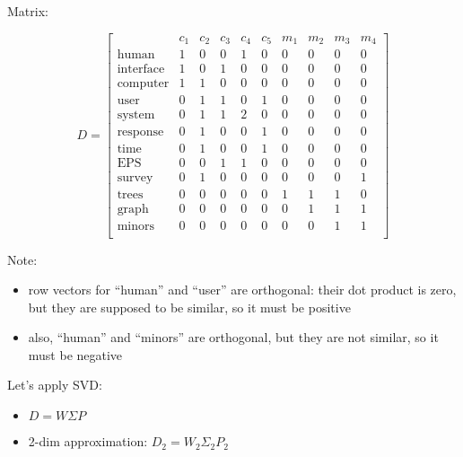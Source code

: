Matrix:

$$D =
\left[\begin{array}{c|ccccccccc}
 & c_1 & c_2 & c_3 & c_4 & c_5 & m_1 & m_2 & m_3 & m_4 \\ 
\hline
\text{human} & 1 & 0 & 0 & 1 & 0 & 0 & 0 & 0 & 0 \\
\text{interface} & 1 & 0 & 1 & 0 & 0 & 0 & 0 & 0 & 0 \\ 
\text{computer} & 1 & 1 & 0 & 0 & 0 & 0 & 0 & 0 & 0 \\
\text{user} & 0 & 1 & 1 & 0 & 1 & 0 & 0 & 0 & 0 \\ 
\text{system} & 0 & 1 & 1 & 2 & 0 & 0 & 0 & 0 & 0 \\
\text{response} & 0 & 1 & 0 & 0 & 1 & 0 & 0 & 0 & 0 \\
\text{time} & 0 & 1 & 0 & 0 & 1 & 0 & 0 & 0 & 0 \\
\text{EPS} & 0 & 0 & 1 & 1 & 0 & 0 & 0 & 0 & 0 \\ 
\text{survey} & 0 & 1 & 0 & 0 & 0 & 0 & 0 & 0 & 1 \\
\text{trees} & 0 & 0 & 0 & 0 & 0 & 1 & 1 & 1 & 0 \\
\text{graph} & 0 & 0 & 0 & 0 & 0 & 0 & 1 & 1 & 1 \\
\text{minors} & 0 & 0 & 0 & 0 & 0 & 0 & 0 & 1 & 1 \\
\end{array} \right] $$

Note:

\begin{itemize}
\itemsep1pt\parskip0pt
\item
  row vectors for ``human'' and ``user'' are orthogonal: their dot
  product is zero, but they are supposed to be similar, so it must be
  positive
\item
  also, ``human'' and ``minors'' are orthogonal, but they are not
  similar, so it must be negative
\end{itemize}

Let's apply SVD:

\begin{itemize}
\itemsep1pt\parskip0pt
\item
  $D = W \Sigma P$
\item
  2-dim approximation: $D_2 = W_2 \Sigma_2 P_2$
\end{itemize}

